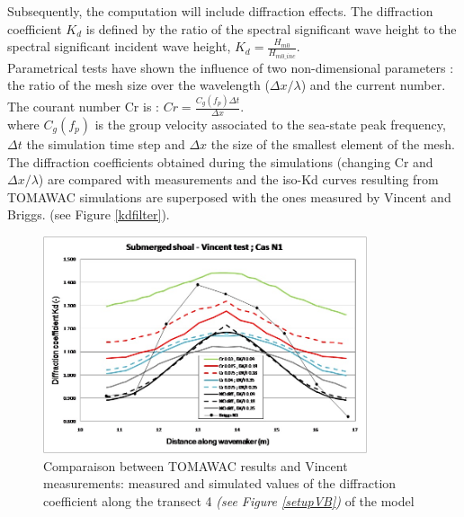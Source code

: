 Subsequently, the computation will include diffraction effects.
The diffraction coefficient $K_d$ is defined by the ratio of the spectral significant wave height to the spectral significant incident wave height, $K_d = \frac{H_{m0}}{H_{m0\_ inc}}$.\\
Parametrical tests have shown the influence of two non-dimensional parameters : the ratio of the mesh size over the wavelength ($\Delta x / \lambda$) and the current number.
The courant number Cr is : $Cr = \frac{C_g(f_p)\Delta t}{\Delta x}$.\\
where $C_g(f_p)$ is the group velocity associated to the sea-state peak frequency, $\Delta t$ the simulation time step and $\Delta x$ the size of the smallest element of the mesh.\\ 
The diffraction coefficients obtained during the simulations (changing Cr and $\Delta x / \lambda $) are compared with measurements \cite{vincent} and the iso-Kd curves resulting from TOMAWAC simulations are superposed with the ones measured by Vincent and Briggs. (see Figure \ref{kdfilter}). 


\begin{figure}[!h]
  \centering
    \includegraphics[width=0.85\textwidth]{Kd.jpg}
      \caption{Comparaison between TOMAWAC results and Vincent measurements: measured and simulated values of the diffraction coefficient along the transect 4 \textit{(see Figure \ref{setupVB})} of the model}
\label{kd4}
\end{figure}

